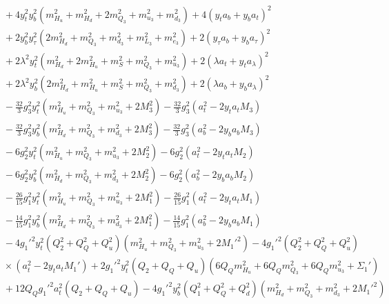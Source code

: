 \documentclass[preprint,amsmath,amssymb,aps,superscriptaddress,prd,
showpacs,floatfix,nofootinbib]{revtex4-1}
\begin{document}
\begin{subequations}
\begin{align}
& {} + 4 y_t^2 y_b^2 \left ( m_{H_u}^2 + m_{H_d}^2 + 2 m_{Q_3}^2 + m_{u_3}^2
+ m_{d_3}^2 \right ) + 4 \left ( y_t a_b + y_b a_t \right )^2 \nonumber \\
& {} + 2 y_b^2 y_\tau^2 \left ( 2 m_{H_d}^2 + m_{Q_3}^2 + m_{d_3}^2 +
m_{L_3}^2 + m_{e_3}^2 \right ) + 2 \left ( y_\tau a_b + y_b a_\tau \right )^2
\nonumber \\
& {} + 2 \lambda^2 y_t^2 \left ( m_{H_d}^2 + 2 m_{H_u}^2 + m_S^2 + m_{Q_3}^2
+ m_{u_3}^2 \right ) + 2 \left ( \lambda a_t + y_t a_\lambda \right )^2
\nonumber \\
& {} + 2 \lambda^2 y_b^2 \left ( 2 m_{H_d}^2 + m_{H_u}^2 + m_S^2 + m_{Q_3}^2
+ m_{d_3}^2 \right ) + 2 \left ( \lambda a_b + y_b a_\lambda \right )^2
\nonumber \\
& {} - \frac{32}{3} g_3^2 y_t^2 \left ( m_{H_u}^2 + m_{Q_3}^2 + m_{u_3}^2 +
2 M_3^2 \right ) - \frac{32}{3} g_3^2 \left ( a_t^2 - 2 y_t a_t M_3 \right )
\nonumber \\
& {} - \frac{32}{3} g_3^2 y_b^2 \left ( m_{H_d}^2 + m_{Q_3}^2 + m_{d_3}^2 +
2 M_3^2 \right ) - \frac{32}{3} g_3^2 \left ( a_b^2 - 2 y_b a_b M_3 \right )
\nonumber \\
& {} - 6 g_2^2 y_t^2 \left ( m_{H_u}^2 + m_{Q_3}^2 + m_{u_3}^2 + 2 M_2^2
\right ) - 6 g_2^2 \left ( a_t^2 - 2 y_t a_t M_2 \right ) \nonumber \\
& {} - 6 g_2^2 y_b^2 \left ( m_{H_d}^2 + m_{Q_3}^2 + m_{d_3}^2 + 2 M_2^2
\right ) - 6 g_2^2 \left ( a_b^2 - 2 y_b a_b M_2 \right ) \nonumber \\
& {} - \frac{26}{15} g_1^2 y_t^2 \left ( m_{H_u}^2 + m_{Q_3}^2 + m_{u_3}^2 +
2 M_1^2 \right ) - \frac{26}{15} g_1^2 \left ( a_t^2 - 2 y_t a_t M_1 \right )
\nonumber \\
& {} - \frac{14}{15} g_1^2 y_b^2 \left ( m_{H_d}^2 + m_{Q_3}^2 + m_{d_3}^2 +
2 M_1^2 \right ) - \frac{14}{15} g_1^2 \left ( a_b^2 - 2 y_b a_b M_1 \right )
\nonumber \\
& {} - 4 g_1'^2 y_t^2 \left ( Q_2^2 + Q_Q^2 + Q_u^2 \right ) \left ( m_{H_u}^2
+ m_{Q_3}^2 + m_{u_3}^2 + 2 M_1'^2 \right ) - 4 g_1'^2 \left ( Q_2^2 + Q_Q^2
+ Q_u^2 \right ) \nonumber \\
& {} \times \left ( a_t^2 - 2 y_t a_t M_1' \right ) + 2 g_1'^2 y_t^2 \left (
Q_2 + Q_Q + Q_u \right ) \left ( 6 Q_Q m_{H_u}^2 + 6 Q_Q m_{Q_3}^2 +
6 Q_Q m_{u_3}^2 + \Sigma_1' \right ) \nonumber \\
& {} + 12 Q_Q g_1'^2 a_t^2 \left ( Q_2 + Q_Q + Q_u \right ) -
4 g_1'^2 y_b^2 \left ( Q_1^2 + Q_Q^2 + Q_d^2 \right ) \left ( m_{H_d}^2 +
m_{Q_3}^2 + m_{d_3}^2 + 2 M_1'^2 \right ) \nonumber \\

\end{align}
\end{subequations}
\end{document}
